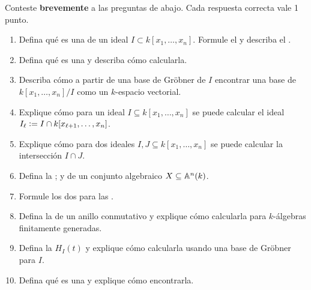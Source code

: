 \documentclass{article}
\theoremstyle{definition}
\begin{document}
\pagestyle{empty}


Conteste \textbf{brevemente} a las preguntas de abajo. Cada respuesta correcta
vale 1 punto.

\begin{enumerate}
\item Defina qué es una  de un ideal
  $I \subset k [x_1,\ldots,x_n]$. Formule el  y
  describa el .

\item Defina qué es una  y describa cómo
  calcularla.

\item Describa cómo a partir de una base de Gröbner de $I$ encontrar una base de
  $k [x_1,\ldots,x_n]/I$ como un $k$-espacio vectorial.

\item Explique cómo para un ideal $I \subseteq k [x_1,\ldots,x_n]$ se puede
  calcular el ideal $I_\ell \dfn I \cap k [x_{\ell+1},\ldots,x_n]$.

\item Explique cómo para dos ideales $I,J \subseteq k [x_1,\ldots,x_n]$ se puede
  calcular la intersección $I \cap J$.

\item Defina la ;  y
   de un conjunto algebraico
  $X \subseteq \AA^n (k)$.

\item Formule los dos  para las
  .

\item Defina la  de un anillo conmutativo y explique
  cómo calcularla para $k$-álgebras finitamente generadas.

\item Defina la  $H_I (t)$ y explique cómo calcularla
  usando una base de Gröbner para $I$.

\item Defina qué es una  y explique cómo
  encontrarla.
\end{enumerate}
\end{document}
